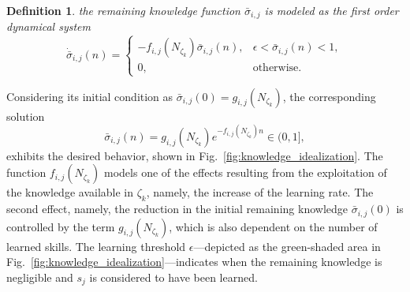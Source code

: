 \documentclass[12pt]{article}
\newtheorem{definition}{Definition}
\begin{document}
\begin{definition}\label{assumption:ode_model} the remaining knowledge function $\bar{\sigma}_{i,j}$ is modeled as the first order dynamical system
	\begin{equation}\label{eq:simple_knowledge_dynamics}
		\dot{\bar{\sigma}}_{i,j}\left(n\right)=\begin{cases}
			-f_{i,j} \left(N_{\zeta_k} \right) \bar{\sigma}_{i,j}\left(n\right), & \epsilon < \bar{\sigma}_{i,j}\left(n\right) < 1, \\
			0, & \text{otherwise}.
		\end{cases}
	\end{equation}	
\end{definition}
\noindent Considering its initial condition as $\bar{\sigma}_{i,j}(0) =  g_{i,j} \left(N_{\zeta_k}\right)$, the corresponding solution
\begin{equation}\label{eq:knowledge_exponential_form}
	\bar{\sigma}_{i,j}(n) = g_{i,j}(N_{\zeta_k}) e ^{-f_{i,j}\left(N_{\zeta_k}\right) n} \in (0,1],
\end{equation}
exhibits the desired behavior, shown in Fig.~\ref{fig:knowledge_idealization}. The function $f_{i,j}\left(N_{\zeta_k}\right)$ models one of the effects resulting from the exploitation of the knowledge available in $\zeta_k$, namely, the increase of the learning rate. The second effect, namely, the reduction in the initial remaining knowledge $\bar{\sigma}_{i,j}(0)$ is controlled by the term $g_{i,j}\left(N_{\zeta_k}\right)$, which is also dependent on the number of learned skills. The learning threshold $\epsilon$---depicted as the green-shaded area in Fig.~\ref{fig:knowledge_idealization}---indicates when the remaining knowledge is negligible and $s_{j}$ is considered to have been learned.
\end{document}

